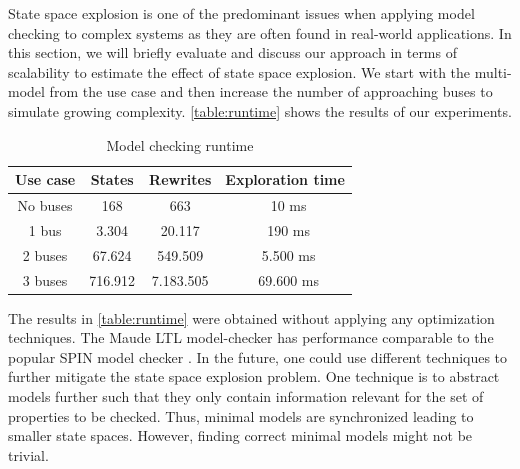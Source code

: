 \documentclass{jot}
\begin{document}
State space explosion is one of the predominant issues when applying model checking to complex systems as they are often found in real-world applications.
In this section, we will briefly evaluate and discuss our approach in terms of scalability to estimate the effect of state space explosion.
We start with the multi-model from the use case and then increase the number of approaching buses to simulate growing complexity.
\autoref{table:runtime} shows the results of our experiments.

\begin{table}
\centering
\begin{tabular}{|c || c | c | c |}
 \hline
 Use case & States & Rewrites & Exploration time \\
 \hline\hline
 No buses & 168 & 663 & ~10 ms \\
 \hline
 1 bus & 3.304 & 20.117 & ~190 ms \\
 \hline
 2 buses & 67.624 & 549.509 & ~5.500 ms \\
 \hline
 3 buses & 716.912 & 7.183.505 & ~69.600 ms \\
 \hline
\end{tabular}
\caption[Model checking runtime]{Model checking runtime\footnotemark}
\label{table:runtime}
\end{table}


The results in \autoref{table:runtime} were obtained without applying any optimization techniques.
The Maude LTL model-checker has performance comparable to the popular SPIN model checker \cite{ekerMaudeLTLModel2004}.
In the future, one could use different techniques to further mitigate the state space explosion problem.
One technique is to abstract models further such that they only contain information relevant for the set of properties to be checked.
Thus, minimal models are synchronized leading to smaller state spaces.
However, finding correct minimal models might not be trivial.
\end{document}
